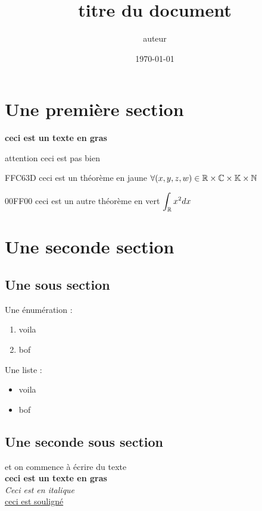 \documentclass[10pt]{article}
\title{titre du document}
\author{auteur}
\date{\today}
\begin{document}
    \maketitle
    \tableofcontents %
    \newpage %
    
    \section{Une première section}
    
        \textbf{ceci est un texte en gras}
    
        \begin{warningbox}
            attention ceci est pas bien
        \end{warningbox}

        \begin{cadre}{FFC63D}
            ceci est un théorème en jaune $\forall (x,y,z,w) \in \mathbb{R} \times \mathbb{C} \times \mathbb{K} \times \mathbb{N}$
        \end{cadre}

        \begin{cadre}{00FF00}
            ceci est un autre théorème en vert $\displaystyle \int_{\mathbb{R}} x^2 dx$
        \end{cadre}
    
    \section{Une seconde section}
    
    \subsection{Une sous section}
    
    Une énumération :
    \begin{enumerate}
        \item voila
        \item bof
    \end{enumerate}
    \vspace{2em}
    Une liste :
    \begin{itemize}
        \item voila
        \item bof
    \end{itemize}
    
    \subsection{Une seconde sous section}

    et on commence à écrire du texte \\
    \textbf{ceci est un texte en gras}\\
    \textit{Ceci est en italique}\\
    \underline{ceci est souligné}
\end{document}

